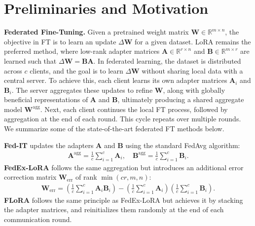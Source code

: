 \section{Preliminaries and Motivation} \label{sec:motivation}

\quad \textbf{Federated Fine-Tuning.}  
Given a pretrained weight matrix \( \mathbf{W} \in \mathbb{R}^{m \times n} \), the objective in FT is to learn an update \( \Delta \mathbf{W} \) for a given dataset.  
LoRA \citep{lora} remains the preferred method, where low-rank adapter matrices \( \mathbf{A} \in \mathbb{R}^{r \times n} \) and \( \mathbf{B} \in \mathbb{R}^{m \times r} \) are learned such that \( \Delta \mathbf{W} = \mathbf{B} \mathbf{A} \).  
In federated learning, the dataset is distributed across \( c \) clients, and the goal is to learn \( \Delta \mathbf{W} \) without sharing local data with a central server.  
To achieve this, each client learns its own adapter matrices \( \mathbf{A}_i \) and \( \mathbf{B}_i \).  
The server aggregates these updates to refine \( \mathbf{W} \), along with globally beneficial representations of \( \mathbf{A} \) and \( \mathbf{B} \), ultimately producing a shared aggregate model \( \mathbf{W}^{\text{agg}} \).
Next, each client continues the local FT process, followed by aggregation at the end of each round. This cycle repeats over multiple rounds.
We summarize some of the state-of-the-art federated FT methods below.

\textbf{Fed-IT} \citep{FedIT} updates the adapters \( \mathbf{A} \) and \( \mathbf{B} \) using the standard FedAvg \citep{mcmahan2017communication} algorithm:
\begin{align}
    \mathbf{A}^{\text{agg}} = \frac{1}{c} \sum_{i=1}^{c} \mathbf{A}_i, \quad 
    \mathbf{B}^{\text{agg}} = \frac{1}{c} \sum_{i=1}^{c} \mathbf{B}_i.
    \label{eq:fedit}
\end{align}
\quad \textbf{FedEx-LoRA} \citep{singhal2024exact} follows the same aggregation but introduces an additional error correction matrix \( \mathbf{W}_{\text{err}} \) of rank \( \min(c r, m, n) \):
\begin{align}
    \mathbf{W}_{\text{err}} = (\frac{1}{c}\sum_{i=1}^{c}\mathbf{A}_i \mathbf{B}_i)-(\frac{1}{c}\sum_{i=1}^{c}\mathbf{A}_i )(\frac{1}{c}\sum_{i=1}^{c} \mathbf{B}_i).
\end{align}
\quad \textbf{FLoRA} \citep{wang2024flora} follows the same principle as FedEx-LoRA but achieves it by stacking the adapter matrices, and reinitializes them randomly at the end of each communication round.

